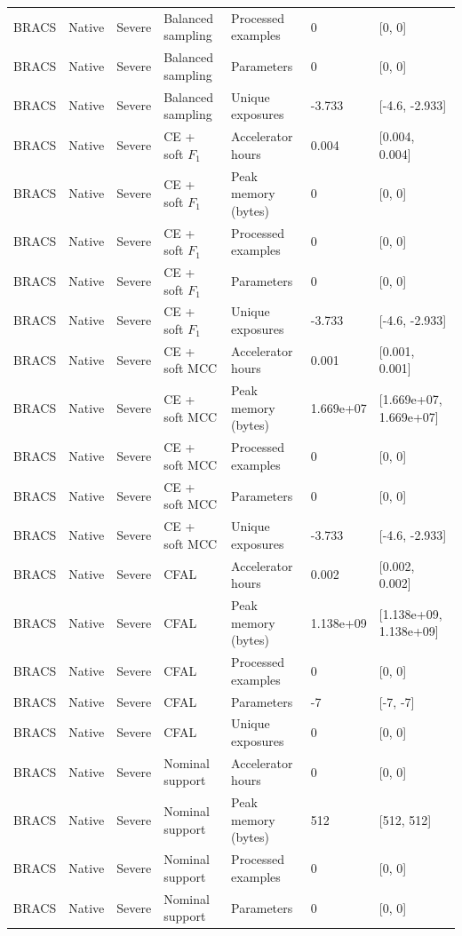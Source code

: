 \begin{longtable}{lllllll}
BRACS & Native & Severe & Balanced sampling & Processed examples & 0 & [0, 0] \\
BRACS & Native & Severe & Balanced sampling & Parameters & 0 & [0, 0] \\
BRACS & Native & Severe & Balanced sampling & Unique exposures & -3.733 & [-4.6, -2.933] \\
BRACS & Native & Severe & CE + soft $F_1$ & Accelerator hours & 0.004 & [0.004, 0.004] \\
BRACS & Native & Severe & CE + soft $F_1$ & Peak memory (bytes) & 0 & [0, 0] \\
BRACS & Native & Severe & CE + soft $F_1$ & Processed examples & 0 & [0, 0] \\
BRACS & Native & Severe & CE + soft $F_1$ & Parameters & 0 & [0, 0] \\
BRACS & Native & Severe & CE + soft $F_1$ & Unique exposures & -3.733 & [-4.6, -2.933] \\
BRACS & Native & Severe & CE + soft MCC & Accelerator hours & 0.001 & [0.001, 0.001] \\
BRACS & Native & Severe & CE + soft MCC & Peak memory (bytes) & 1.669e+07 & [1.669e+07, 1.669e+07] \\
BRACS & Native & Severe & CE + soft MCC & Processed examples & 0 & [0, 0] \\
BRACS & Native & Severe & CE + soft MCC & Parameters & 0 & [0, 0] \\
BRACS & Native & Severe & CE + soft MCC & Unique exposures & -3.733 & [-4.6, -2.933] \\
BRACS & Native & Severe & CFAL & Accelerator hours & 0.002 & [0.002, 0.002] \\
BRACS & Native & Severe & CFAL & Peak memory (bytes) & 1.138e+09 & [1.138e+09, 1.138e+09] \\
BRACS & Native & Severe & CFAL & Processed examples & 0 & [0, 0] \\
BRACS & Native & Severe & CFAL & Parameters & -7 & [-7, -7] \\
BRACS & Native & Severe & CFAL & Unique exposures & 0 & [0, 0] \\
BRACS & Native & Severe & Nominal support & Accelerator hours & 0 & [0, 0] \\
BRACS & Native & Severe & Nominal support & Peak memory (bytes) & 512 & [512, 512] \\
BRACS & Native & Severe & Nominal support & Processed examples & 0 & [0, 0] \\
BRACS & Native & Severe & Nominal support & Parameters & 0 & [0, 0] \\

\end{longtable}
